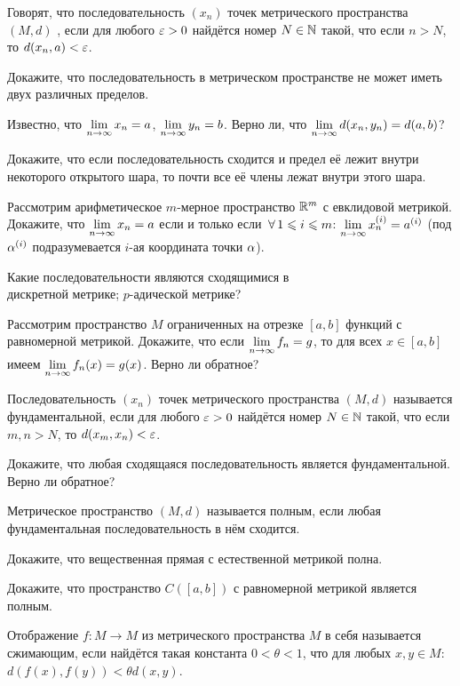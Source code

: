 \documentclass[a4paper,12pt]{article}
\begin{document}

Говорят, что последовательность $(x_n)$ точек метрического пространства $(M, d)$ , если для любого $\varepsilon>0$ найдётся номер $N\in\mathbb{N}$ такой, что если $n>N$, то $d(x_n, a)<\varepsilon$.

Докажите, что последовательность в метрическом пространстве не может иметь двух различных пределов.

Известно, что $\lim\limits_{n \rightarrow \infty} x_n = a$, $\lim\limits_{n \rightarrow \infty} y_n = b$. Верно ли, что $\lim\limits_{n \rightarrow \infty} d(x_n, y_n) = d(a,b)$?

Докажите, что если последовательность сходится и предел её лежит внутри некоторого открытого шара, то почти все её члены лежат внутри этого шара.

Рассмотрим арифметическое $m$-мерное пространство $\mathbb{R}^m$ с евклидовой метрикой. Докажите, что $\lim\limits_{n \rightarrow \infty} x_n = a$ если и только если $\,\forall\, 1\leqslant i\leqslant m$: $\lim\limits_{n \rightarrow \infty} x_n^{(i)} = a^{(i)}$ (под $\alpha^{(i)}$ подразумевается $i$-ая координата точки $\alpha$).

Какие последовательности являются сходящимися в\\
дискретной метрике;
$p$-адической метрике?

Рассмотрим пространство $M$ ограниченных на отрезке $[a, b]$
функций с равномерной метрикой.
Докажите, что если $\lim\limits_{n \rightarrow \infty} f_n = g$, то для всех $x \in [a, b]$ имеем $\lim\limits_{n \rightarrow \infty} f_n(x) = g(x)$.
Верно ли обратное?

Последовательность $(x_n)$ точек метрического пространства $(M,d)$ называется  фундаментальной, если для любого $\varepsilon>0$ найдётся номер $N\in\mathbb{N}$ такой, что если $m,n>N$, то $d(x_m, x_n)<\varepsilon$.

Докажите, что любая сходящаяся последовательность является фундаментальной.
Верно ли обратное?

Метрическое пространство $(M, d)$ называется  полным, если любая фундаментальная последовательность в нём сходится.

Докажите, что вещественная прямая с естественной метрикой полна.

Докажите, что пространство $C([a,b])$ с равномерной метрикой является полным.

Отображение $f\colon M \to M$ из метрического пространства $M$
в себя называется  сжимающим, если найдётся такая константа
$0<\theta<1$, что для любых $x,y\in M$: $d(f(x),f(y))<\theta
d(x,y)$.
\end{document}
